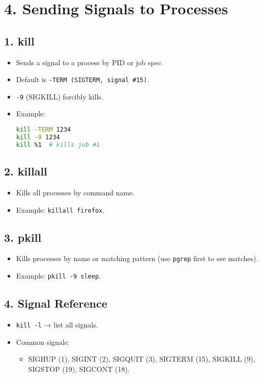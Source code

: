 \documentclass[a4paper]{report}
\begin{document}
\section*{4. Sending Signals to Processes}

\subsection*{1. kill}
\begin{itemize}
    \item Sends a signal to a process by PID or job spec.
    \item Default is \texttt{-TERM (SIGTERM, signal \#15)}.
    \item \texttt{-9} (SIGKILL) forcibly kills.
    \item Example:
\begin{lstlisting}[language=bash]
kill -TERM 1234
kill -9 1234
kill %1  # kills job #1
\end{lstlisting}
\end{itemize}

\subsection*{2. killall}
\begin{itemize}
    \item Kills all processes by command name.
    \item Example: \texttt{killall firefox}.
\end{itemize}

\subsection*{3. pkill}
\begin{itemize}
    \item Kills processes by name or matching pattern (use \texttt{pgrep} first to see matches).
    \item Example: \texttt{pkill -9 sleep}.
\end{itemize}
    
    \subsection*{4. Signal Reference}
    \begin{itemize}
        \item \texttt{kill -l} → list all signals.
        \item Common signals:
        \begin{itemize}
            \item SIGHUP (1), SIGINT (2), SIGQUIT (3), SIGTERM (15), SIGKILL (9), SIGSTOP (19), SIGCONT (18).
        \end{itemize}

    \end{itemize}
    
\end{document}
